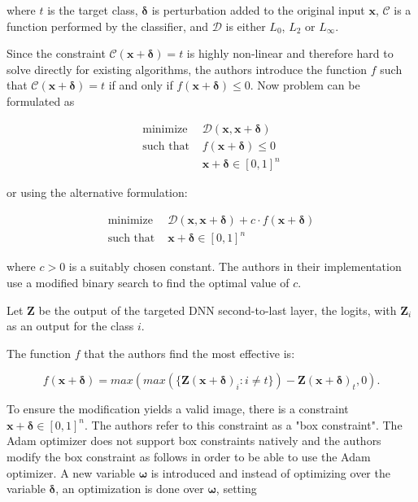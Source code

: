 where $t$ is the target class, $\pmb \delta$ is perturbation added to the original input $\pmb x$, $\mathcal{C}$ is a function performed by the classifier, and $\mathcal{D}$ is either $L_0$, $L_2$ or $L_\infty$. 

Since the constraint $\mathcal{C} (\pmb x + \pmb \delta) = t$ is highly non-linear and therefore hard to solve directly for existing algorithms, the authors introduce the function $f$ such that  $\mathcal{C} (\pmb x + \pmb \delta) = t$ if and only if $f(\pmb x + \pmb \delta) \leq 0$. Now problem can be formulated as

\begin{align*}
\text{minimize  } & \mathcal{D}(\pmb x, \pmb x + \pmb \delta) \\
\text{such that }& f(\pmb x + \pmb \delta) \leq 0 \\
                  & \pmb x + \pmb \delta \in [0, 1]^n
\end{align*}

or using the alternative formulation: 

\begin{align*}
\text{minimize  }& \mathcal{D}(\pmb x, \pmb x + \pmb \delta) + c \cdot f(\pmb x+\pmb \delta) \\
\text{such that }& \pmb x + \pmb \delta \in [0, 1]^n
\end{align*}

where $c > 0$ is a suitably chosen constant. The authors in their implementation use a modified binary search to find the optimal value of $c$. 

Let $\pmb Z$ be the output of the targeted DNN second-to-last layer, the logits,  with $\pmb Z_i$ as an output for the class $i$.

The function $f$ that the authors find the most effective is: 

\begin{equation}
f(\pmb x + \pmb \delta) = max(max(\{\pmb Z(\pmb x + \pmb \delta)_i : i \neq t\}) - \pmb Z(\pmb x + \pmb \delta)_t, 0).
\label{fun:obj-fun}
\end{equation}

To ensure the modification yields a valid image, there is a constraint  $\pmb x + \pmb \delta \in [0, 1]^n$. The authors refer to this constraint as a "box constraint". The Adam \cite{DBLP:journals/corr/KingmaB14} optimizer does not support box constraints  natively and the authors modify the box constraint as follows in order to be able to use the Adam optimizer. A new variable $\pmb \omega$ is introduced and instead of optimizing over the variable $\pmb \delta$, an optimization is done over $\pmb \omega$, setting 

